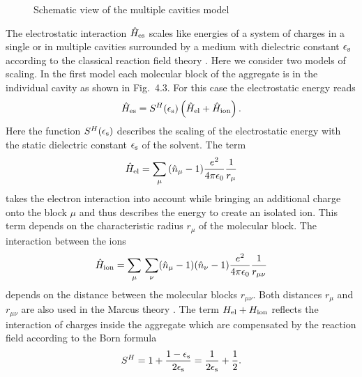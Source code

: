 \documentclass[12pt,twoside,a4paper]{report}
\begin{document}
\footnotesize\begin{figure}[!h]\centering
  \parbox{7.3cm}
  {\rule{0cm}{0cm}
\epsfxsize=7cm
}
\label{multi-fig}
\caption[Schematic view of the 
multiple cavities model]
{\small Schematic view of the 
multiple cavities model
}
\end{figure}\normalsize
The electrostatic interaction $\hat H_{\rm es}$ 
scales  
like energies of a system of charges in a single or in multiple 
cavities surrounded by 
a medium  with dielectric constant $\epsilon_{\rm s}$
according to the classical reaction field theory \cite{Boettcher}.
Here we consider two models of scaling.
In the first model each molecular block
of the aggregate is in the individual cavity as shown in Fig.~4.3.
For this case the electrostatic energy reads
\begin{equation}
 \hat  H_{\rm es}  =     S^H(\epsilon_{\rm s})
                         \left(
                             \hat H_{\rm el}
                          +  \hat H_{\rm ion}
                         \right).
  \label{static-SB-inter}
\end{equation}
Here the function $S^H(\epsilon_{\rm s})$ describes the
scaling of the electrostatic energy with 
the static dielectric constant $\epsilon_{\rm s}$ of the solvent. The term
\begin{eqnarray}
  \label{3-via-B} 
\hat H_{\rm el} 
                  =   \sum_\mu{}
                          (\hat n_\mu{}-1)
                          \frac{e^2}
                               {4 \pi \epsilon_0}
                          \frac{1}
                               {r_\mu{}} 
\end{eqnarray}
takes the electron interaction into account while bringing an
additional charge onto the block $\mu{}$ and thus describes 
the energy to create an isolated ion.  
This term depends on the characteristic radius  $r_\mu{}$ 
of the molecular block. 
The interaction between the  ions
\begin{eqnarray}
  \label{4-via-B}
  \hat H_{\rm ion}
                   =    \sum_\mu{} 
                        \sum_{\nu} (\hat n_\mu{}-1)
                                   (\hat n_{\nu}-1)
                                   \frac{e^2}{4\pi\epsilon_0}
                                   \frac{1}{r_{\mu{}\nu}}
\end{eqnarray}
 depends on the distance between 
the molecular blocks $r_{\mu{}\nu}$.  
Both distances $r_\mu{}$ and $r_{\mu{}\nu}$
 are also used in the Marcus theory \cite{marc56}.  
The term $H_{\rm el}+H_{\rm ion}$ reflects the interaction of charges 
inside the aggregate which are compensated by the reaction field  according 
to the Born formula \cite{Karelson} 
\begin{equation}
\label{Born-scaling}
S^H
       =    
              1   +   \frac
                           {1-\epsilon_{\rm s}}
                           {2\epsilon_{\rm s}}
       =      \frac1{2\epsilon_{\rm s}}+\frac12. 
\end{equation}
\end{document}
